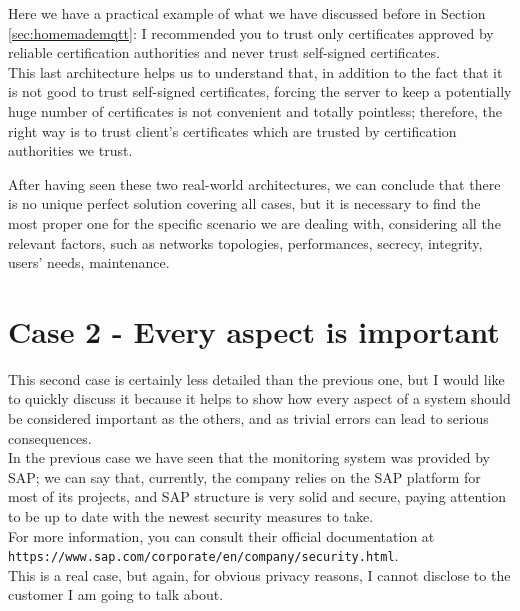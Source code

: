 \documentclass[12pt]{report}
\begin{document}
{Here we have a practical example of what we have discussed before in Section \ref{sec:homemademqtt}: I recommended you to trust only certificates approved by reliable certification authorities and never trust self-signed certificates. \\
This last architecture helps us to understand that, in addition to the fact that it is not good to trust self-signed certificates, forcing the server to keep a potentially huge number of certificates is not convenient and totally pointless; therefore, the right way is to trust client's certificates which are trusted by certification authorities we trust.\\

\bigskip

After having seen these two real-world architectures, we can conclude that there is no unique perfect solution covering all cases, but it is necessary to find the most proper one for the specific scenario we are dealing with, considering all the relevant factors, such as networks topologies, performances, secrecy, integrity, users' needs, maintenance.\\



\section{Case 2 - Every aspect is important }
\bigskip
This second case is certainly less detailed than the previous one, but I would like to quickly discuss it because it helps to show how every aspect of a system should be considered important as the others, and as trivial errors can lead to serious consequences.\\

In the previous case we have seen that the monitoring system was provided by SAP; we can say that, currently, the company relies on the SAP platform for most of its projects, and SAP structure is very solid and secure, paying attention to be up to date with the newest security measures to take.\\
For more information, you can consult their official documentation at \\ \texttt{https://www.sap.com/corporate/en/company/security.html}.\\

This is a real case, but again, for obvious privacy reasons, I cannot disclose to the customer I am going to talk about.\\

}
\end{document}
